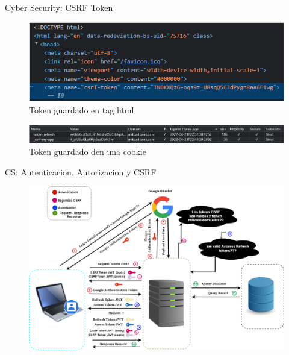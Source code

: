 \documentclass[xcolor=pdftex,dvipsnames,table]{beamer}
\begin{document}
\begin{frame}{Cyber Security: CSRF Token}
        \begin{figure}
            \centering
            \includegraphics[width=1\linewidth]{cyber/csfr.PNG} 
            \caption*{Token guardado en tag html}
            \label{fig:my_label}
        \end{figure}
        
        \begin{figure}
            \centering
            \includegraphics[width=1\linewidth]{cyber/cockie csrf y refresh.PNG} 
            \caption*{Token guardado den una cookie}
            \label{fig:my_label}
        \end{figure}
\end{frame}
\begin{frame}{CS: Autenticacion, Autorizacion y CSRF}
        \begin{figure}
            \centering
            \includegraphics[width=1\linewidth]{cyber/TOFDO.png}
            \label{fig:my_label}
        \end{figure}
\end{frame}
\end{document}
